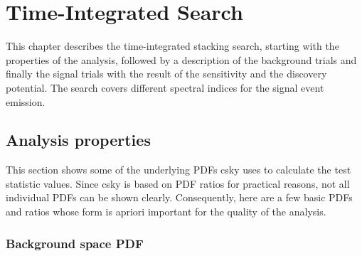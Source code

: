 \chapter{Time-Integrated Search}

This chapter describes the time-integrated stacking search, starting with the properties of the analysis, followed by a description of the background trials and finally the signal trials with the result of the sensitivity and the discovery potential.
The search covers different spectral indices for the signal event emission.

\section{Analysis properties}

This section shows some of the underlying PDFs csky uses to calculate the test statistic values.
Since csky is based on PDF ratios for practical reasons, not all individual PDFs can be shown clearly.
Consequently, here are a few basic PDFs and ratios whose form is apriori important for the quality of the analysis.

\subsection{Background space PDF}

